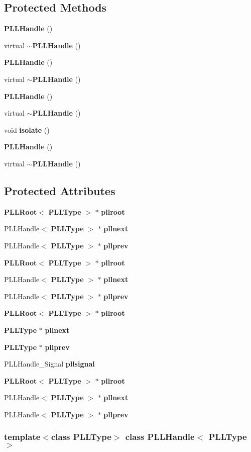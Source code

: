 \subsection*{Protected Methods}
\begin{CompactItemize}
\item 
{\bf PLLHandle} ()
\item 
virtual {\bf $\sim$PLLHandle} ()
\item 
{\bf PLLHandle} ()
\item 
virtual {\bf $\sim$PLLHandle} ()
\item 
{\bf PLLHandle} ()
\item 
virtual {\bf $\sim$PLLHandle} ()
\item 
void {\bf isolate} ()
\item 
{\bf PLLHandle} ()
\item 
virtual {\bf $\sim$PLLHandle} ()
\end{CompactItemize}
\subsection*{Protected Attributes}
\begin{CompactItemize}
\item 
{\bf PLLRoot}$<$ {\bf PLLType} $>$ $\ast$ {\bf pllroot}
\item 
PLLHandle$<$ {\bf PLLType} $>$ $\ast$ {\bf pllnext}
\item 
PLLHandle$<$ {\bf PLLType} $>$ $\ast$ {\bf pllprev}
\item 
{\bf PLLRoot}$<$ {\bf PLLType} $>$ $\ast$ {\bf pllroot}
\item 
PLLHandle$<$ {\bf PLLType} $>$ $\ast$ {\bf pllnext}
\item 
PLLHandle$<$ {\bf PLLType} $>$ $\ast$ {\bf pllprev}
\item 
{\bf PLLRoot}$<$ {\bf PLLType} $>$ $\ast$ {\bf pllroot}
\item 
{\bf PLLType} $\ast$ {\bf pllnext}
\item 
{\bf PLLType} $\ast$ {\bf pllprev}
\item 
PLLHandle\_\-Signal {\bf pllsignal}
\item 
{\bf PLLRoot}$<$ {\bf PLLType} $>$ $\ast$ {\bf pllroot}
\item 
PLLHandle$<$ {\bf PLLType} $>$ $\ast$ {\bf pllnext}
\item 
PLLHandle$<$ {\bf PLLType} $>$ $\ast$ {\bf pllprev}
\end{CompactItemize}
\subsubsection*{template$<$class PLLType$>$ class PLLHandle$<$ PLLType $>$}



